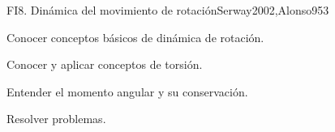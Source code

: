 \begin{sumilla}
\begin{unit}{FI8. Din\'amica del movimiento de rotaci\'on}{Serway2002,Alonso95}{3}
   \begin{objetivos}
      \item Conocer conceptos b\'asicos de din\'amica de rotaci\'on.
      \item Conocer y aplicar conceptos de torsi\'on.
      \item Entender el momento angular y su conservaci\'on.
      \item Resolver problemas.
   \end{objetivos}
\end{unit}

\begin{bibliografia}
\end{bibliografia}
\end{sumilla}


